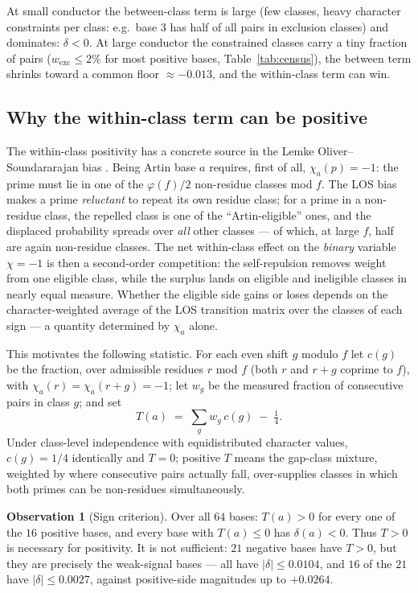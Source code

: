 \documentclass[11pt,reqno]{amsart}
\theoremstyle{plain}
\theoremstyle{definition}
\newtheorem{observation}[theorem]{Observation}
\begin{document}
At small conductor the between-class term is large (few classes, heavy
character constraints per class: e.g.\ base $3$ has half of all pairs in
exclusion classes) and dominates: $\delta < 0$. At large conductor the
constrained classes carry a tiny fraction of pairs
($w_{\mathrm{exc}} \le 2\%$ for most positive bases,
Table~\ref{tab:census}), the between term shrinks toward a common floor
$\approx -0.013$, and the within-class term can win.

\subsection{Why the within-class term can be positive}
The within-class positivity has a concrete source in the Lemke
Oliver--Soundararajan bias \cite{LOS2016}. Being Artin base $a$ requires, first
of all, $\chi_a(p) = -1$: the prime must lie in one of the $\varphi(f)/2$
non-residue classes mod $f$. The LOS bias makes a prime \emph{reluctant} to
repeat its own residue class; for a prime in a non-residue class, the
repelled class is one of the ``Artin-eligible'' ones, and the displaced
probability spreads over \emph{all} other classes --- of which, at large $f$,
half are again non-residue classes. The net within-class effect on the
\emph{binary} variable $\chi = -1$ is then a second-order competition: the
self-repulsion removes weight from one eligible class, while the surplus
lands on eligible and ineligible classes in nearly equal measure. Whether
the eligible side gains or loses depends on the character-weighted average
of the LOS transition matrix over the classes of each sign --- a quantity
determined by $\chi_a$ alone.

This motivates the following statistic. For each even shift $g$ modulo $f$
let $c(g)$ be the fraction, over admissible residues $r$ mod $f$ (both $r$
and $r+g$ coprime to $f$), with $\chi_a(r) = \chi_a(r+g) = -1$; let $w_g$ be
the measured fraction of consecutive pairs in class $g$; and set
\begin{equation}
\label{eq:T}
  T(a) \;=\; \sum_{g} w_g\, c(g) \;-\; \tfrac14 .
\end{equation}
Under class-level independence with equidistributed character values,
$c(g) = 1/4$ identically and $T = 0$; positive $T$ means the gap-class
mixture, weighted by where consecutive pairs actually fall, over-supplies
classes in which both primes can be non-residues simultaneously.

\begin{observation}[Sign criterion]
\label{obs:sign}
Over all $64$ bases: $T(a) > 0$ for every one of the $16$ positive bases,
and every base with $T(a) \le 0$ has $\delta(a) < 0$. Thus $T > 0$ is
necessary for positivity. It is not sufficient: $21$ negative bases have
$T > 0$, but they are precisely the weak-signal bases --- all have
$|\delta| \le 0.0104$, and $16$ of the $21$ have $|\delta| \le 0.0027$,
against positive-side magnitudes up to $+0.0264$.
\end{observation}
\end{document}
